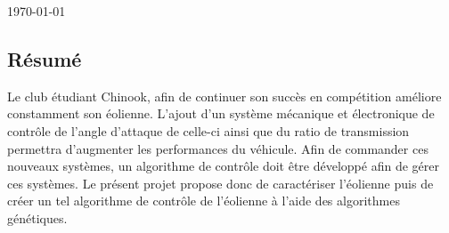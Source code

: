 \documentclass[11pt]{article}
\begin{document}
\begin{titlepage}


\vfill

{\large \today}\\[3cm] %


 

\end{titlepage}


\vspace*{\fill}
\begin{center}
\section*{Résumé}
\end{center}

Le club étudiant Chinook, afin de continuer son succès en compétition améliore constamment son éolienne. L'ajout d'un système mécanique et électronique de contrôle de l'angle d'attaque de celle-ci ainsi que du ratio de transmission permettra d'augmenter les performances du véhicule. Afin de commander ces nouveaux systèmes, un algorithme de contrôle doit être développé afin de gérer ces systèmes. Le présent projet propose donc de caractériser l'éolienne puis de créer un tel algorithme de contrôle de l'éolienne à l'aide des algorithmes génétiques.

\vspace*{\fill}
\clearpage
\end{document}
